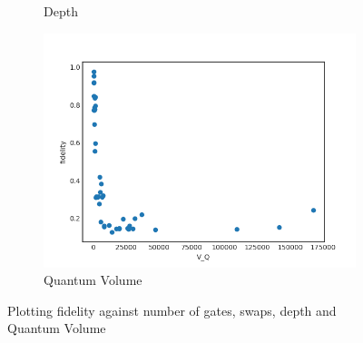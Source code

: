 \documentclass[11pt]{article}
\begin{document}
\begin{figure}[H]
\begin{subfigure}[b]{0.5\linewidth}
    \caption{Depth} 
    \label{fig:f_d_1000} 
  \end{subfigure}%
  \begin{subfigure}[b]{0.5\linewidth}
    \centering
    \includegraphics[width=0.75\linewidth]{f_q_1000} 
    \caption{Quantum Volume} 
    \label{fig:f_q_1000} 
  \end{subfigure} 
  \caption{Plotting fidelity against number of gates, swaps, depth and Quantum Volume}
  \label{fig:f_1000} 
\end{figure}
\end{document}
